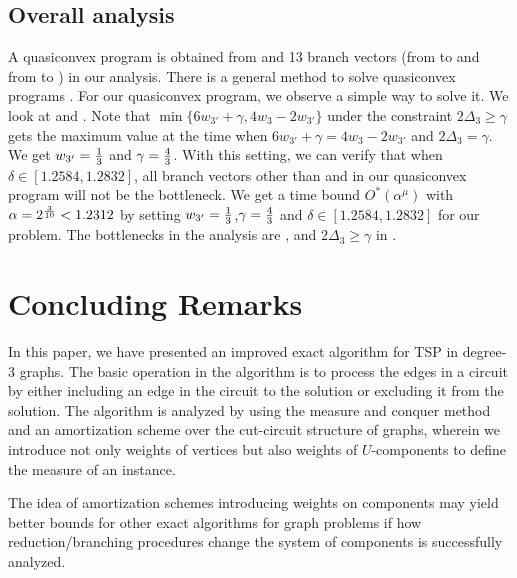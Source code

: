 \documentclass[runningheads]{llncs}
\begin{document}
\subsection{Overall analysis}

A quasiconvex program is obtained from  and 13 branch vectors
(from  to  and from  to )
in our analysis.
There is a general method to solve quasiconvex programs \cite{eQP}.
For our quasiconvex program, we observe a simple way to solve it.
We look at  and . Note that $\min \{6w_{3'}+\gamma, 4w_3-2w_{3'}\}$ under the constraint $2\Delta_3 \geq \gamma$ gets the maximum value at the time when $6w_{3'}+\gamma=4w_3-2w_{3'}$ and $2\Delta_3 =\gamma$. We get $w_{3'}={1 \over 3}$ and $\gamma={4\over 3}$. With this setting, we can verify that when $\delta\in [1.2584, 1.2832]$, all branch vectors other than
 and  in our quasiconvex program will not be the bottleneck.
We get a time bound $O^*(\alpha^{\mu})$ with $\alpha=2^{3\over 10}<1.2312$ by setting
$w_{3'}={1 \over 3}$,$\gamma={4\over 3}$ and $\delta\in [1.2584, 1.2832]$ for our problem.
The bottlenecks in the analysis are   ,  and $2\Delta_3 \geq \gamma$ in .



\section{Concluding Remarks}\label{sec:conclude}

In this paper, we have presented an improved exact algorithm for TSP
in  degree-3 graphs.
The basic operation in the algorithm is to process the edges
in a circuit by either
including an edge in the circuit to the solution or excluding
 it from the solution.
The algorithm is analyzed by using the measure and conquer method and
an amortization scheme over the cut-circuit structure of graphs,
wherein we introduce not only weights of vertices but also
weights of $U$-components to define
the measure of an instance.

The idea of amortization schemes introducing weights on
components may yield better bounds for other exact algorithms
for graph problems if
how reduction/branching procedures change the system of
components  is successfully analyzed.
\end{document}
